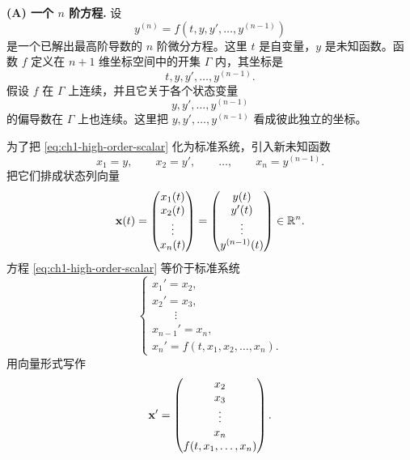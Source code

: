 \textbf{(A) 一个 \(n\) 阶方程.} 设
\begin{equation}
 y^{(n)}=f(t,y,y',\ldots,y^{(n-1)})
 \label{eq:ch1-high-order-scalar}
\end{equation}
是一个已解出最高阶导数的 \(n\) 阶微分方程。这里 \(t\) 是自变量，\(y\) 是未知函数。函数 \(f\) 定义在 \(n+1\) 维坐标空间中的开集 \(\Gamma\) 内，其坐标是
\[
 t,y,y',\ldots,y^{(n-1)}.
\]
假设 \(f\) 在 \(\Gamma\) 上连续，并且它关于各个状态变量
\[
 y,y',\ldots,y^{(n-1)}
\]
的偏导数在 \(\Gamma\) 上也连续。这里把 \(y,y',\ldots,y^{(n-1)}\) 看成彼此独立的坐标。

为了把 \eqref{eq:ch1-high-order-scalar} 化为标准系统，引入新未知函数
\begin{equation}
 x_1=y,\qquad x_2=y',\qquad \ldots,\qquad x_n=y^{(n-1)}.
 \label{eq:ch1-companion-coordinates}
\end{equation}
把它们排成状态列向量
\begin{equation}
 \vect{x}(t)=
 \begin{pmatrix}
  x_1(t)\\
  x_2(t)\\
  \vdots\\
  x_n(t)
 \end{pmatrix}
 =
 \begin{pmatrix}
  y(t)\\
  y'(t)\\
  \vdots\\
  y^{(n-1)}(t)
 \end{pmatrix}
 \in\R^n.
 \label{eq:ch1-scalar-state}
\end{equation}
方程 \eqref{eq:ch1-high-order-scalar} 等价于标准系统
\begin{equation}
 \begin{cases}
  x_1'=x_2,\\
  x_2'=x_3,\\
  \qquad\vdots\\
  x_{n-1}'=x_n,\\
  x_n'=f(t,x_1,x_2,\ldots,x_n).
 \end{cases}
 \label{eq:ch1-companion-system}
\end{equation}
用向量形式写作
\begin{equation}
 \vect{x}'=
 \begin{pmatrix}
  x_2\\
  x_3\\
  \vdots\\
  x_n\\
  f(t,x_1,\ldots,x_n)
 \end{pmatrix}.
 \label{eq:ch1-companion-vector}
\end{equation}

